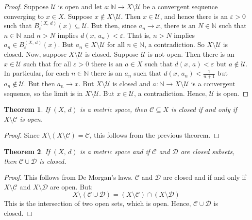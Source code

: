 \documentclass{article}
\theoremstyle{plain}
\newtheorem{theorem}{Theorem}[section]
\theoremstyle{normal}
\begin{document}
        \begin{proof}
            Suppose $\mathcal{U}$ is open and let
            $a:\mathbb{N}\rightarrow{X}\setminus\mathcal{U}$ be a convergent
            sequence converging to $x\in{X}$. Suppose
            $x\notin{X}\setminus\mathcal{U}$. Then $x\in\mathcal{U}$, and hence
            there is an $\varepsilon>0$ such that
            $B_{\varepsilon}^{(X,\,d)}(x)\subseteq\mathcal{U}$. But then,
            since $a_{n}\rightarrow{x}$, there is an $N\in\mathbb{N}$ such that
            $n\in\mathbb{N}$ and $n>N$ implies
            $d(x,\,a_{n})<\varepsilon$. That is, $n>N$ implies
            $a_{n}\in{B}_{\varepsilon}^{(X,\,d)}(x)$. But
            $a_{n}\in{X}\setminus\mathcal{U}$ for all $n\in\mathbb{N}$, a
            contradiction. So $X\setminus\mathcal{U}$ is closed. Now,
            suppose $X\setminus\mathcal{U}$ is closed. Suppose
            $\mathcal{U}$ is not open. Then there is an
            $x\in\mathcal{U}$ such that for all $\varepsilon>0$ there is an
            $a\in{X}$ such that $d(x,\,a)<\varepsilon$ but
            $a\notin\mathcal{U}$. In particular, for each
            $n\in\mathbb{N}$ there is an $a_{n}$ such that
            $d(x,\,a_{n})<\frac{1}{n+1}$ but $a_{n}\notin\mathcal{U}$.
            But then $a_{n}\rightarrow{x}$. But $X\setminus\mathcal{U}$
            is closed and $a:\mathbb{N}\rightarrow{X}\setminus\mathcal{U}$
            is a convergent sequence, so the limit is in
            $X\setminus\mathcal{U}$. But $x\in\mathcal{U}$, a contradiction.
            Hence, $\mathcal{U}$ is open.
        \end{proof}
        \begin{theorem}
            If $(X,\,d)$ is a metric space, then
            $\mathcal{C}\subseteq{X}$ is closed if and only if
            $X\setminus\mathcal{C}$ is open.
        \end{theorem}
        \begin{proof}
            Since $X\setminus(X\setminus\mathcal{C})=\mathcal{C}$,
            this follows from the previous theorem.
        \end{proof}
        \begin{theorem}
            If $(X,\,d)$ is a metric space and if $\mathcal{C}$ and
            $\mathcal{D}$ are closed subsets, then
            $\mathcal{C}\cup\mathcal{D}$ is closed.
        \end{theorem}
        \begin{proof}
            This follows from De Morgan's laws.
            $\mathcal{C}$ and $\mathcal{D}$ are closed and if and only if
            $X\setminus\mathcal{C}$ and $X\setminus\mathcal{D}$ are open.
            But:
            \begin{equation}
                X\setminus(\mathcal{C}\cup\mathcal{D})
                    =(X\setminus\mathcal{C})\cap(X\setminus\mathcal{D})
            \end{equation}
            This is the intersection of two open sets, which is open. Hence,
            $\mathcal{C}\cup\mathcal{D}$ is closed.
        \end{proof}
\end{document}

